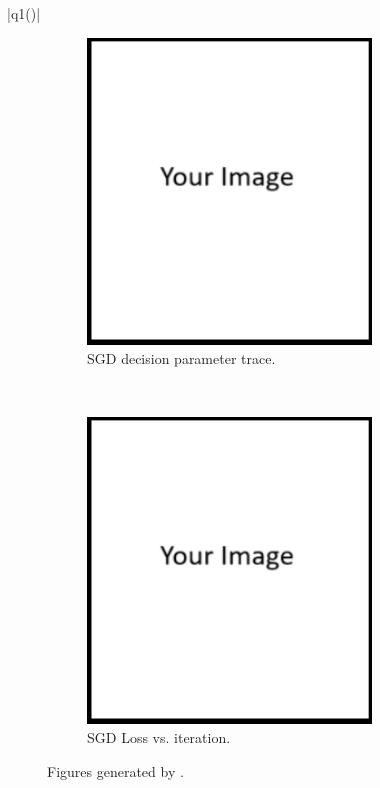 \documentclass{article}
\theoremstyle{definition}
\begin{document}
\begin{enumerate}[label=\ref{partsgd}.\alph*]
\begin{enumerate}[label=\ref{q11a}.\roman*]
			|q1()|
			\begin{figure}[h]
				\centering
				\begin{subfigure}[t]{0.5\textwidth}
					\centering
					\includegraphics[height=3.2in]{image.png}
					\caption{SGD decision parameter trace.}
				\end{subfigure}%
				~ 
				\begin{subfigure}[t]{0.5\textwidth}
					\centering
					\includegraphics[height=3.2in]{image.png}
					\caption{SGD Loss vs. iteration.}
				\end{subfigure}
				\caption{Figures generated by .}
			\end{figure}


\end{enumerate}
\end{enumerate}
\end{document}
